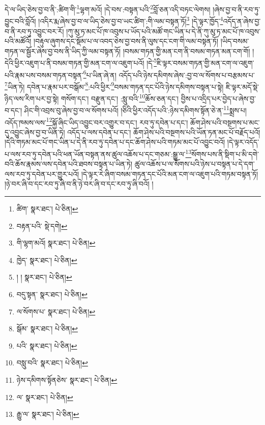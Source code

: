 དེ་ལ་ཡིད་ཅེས་བྱ་བ་ནི་:ཚིག་གི་\footnote{ཚིག་  སྣར་ཐང་།  པེ་ཅིན། }ལྷག་མའོ། །དེ་བས་:བསྟན་པའི་\footnote{བརྟན་པའི་  སྡེ་དགེ། }བློ་ཅན་འདི་བཏང་ལེགས། །ཞེས་བྱ་བ་ནི་རབ་ཏུ་བྱུང་བའི་བློའོ། །འདིར་རྨ་ཞེས་བྱ་བ་ལ་ཡིད་ཅེས་བྱ་བ་ཡང་ཚིག་:གི་ལམ་བསྟན་ཏོ།\footnote{གི་ལྷག་མའོ།  སྣར་ཐང་།  པེ་ཅིན། } །དེ་ལྟར་ཁྱོད་\footnote{ཁྱེད་  སྣར་ཐང་།  པེ་ཅིན། }འདོད་ན་ཞེས་བྱ་བ་ནི་རབ་ཏུ་འབྱུང་བར་རོ། །ཀུ་མུ་ཏ་མང་པོ་ཁ་འབུས་པ་ཡོད་པའི་མཚོ་གང་ཡིན་པ་དེ་ནི་ཀུ་མུ་ཏ་མང་པོ་ཁ་འབུས་པའི་མཚོའོ། །བརྟུལ་ཞུགས་དང་སྡོམ་པ་ལ་འབད་ཅེས་བྱ་བས་ནི་ལུས་དང་ངག་གི་ལམ་བསྟན་ཏོ། །ཡིད་བསམ་གཏན་ལ་སྦྱོར་ཞེས་བྱ་བས་ནི་ཡིད་ཀྱི་ལམ་བསྟན་ཏོ། །བསམ་གཏན་གྱི་མན་ངག་ནི་བསམ་གཏན་མན་ངག་གོ། །དེའི་ཕྱིར་འཇུག་པ་ནི་བསམ་གཏན་གྱི་མན་ངག་ལ་འཇུག་པའོ། །དེ་\footnote{། །  སྣར་ཐང་།  པེ་ཅིན། }ཇི་ལྟར་བསམ་གཏན་གྱི་མན་ངག་ལ་འཇུག་པའི་རྣམ་པས་བསམ་གཏན་བསྟན་\footnote{བདུ་སྟན་  སྣར་ཐང་།  པེ་ཅིན། }པ་ཡིན་ཞེ་ན། འདོད་པའི་ཉེས་དམིགས་ཞེས་:བྱ་བ་ལ་སོགས་པ་བརྩམས་པ་\footnote{ལ་སོགས་པ་  སྣར་ཐང་།  པེ་ཅིན། }ཡིན་ཏེ། དབེན་པ་རྣམ་པར་བསྒོམ་\footnote{སྒོམ་  སྣར་ཐང་།  པེ་ཅིན། }:པའི་ཕྱིར་\footnote{པའི་  སྣར་ཐང་།  པེ་ཅིན། }བསམ་གཏན་དང་པོའི་ཉེས་དམིགས་བསྟན་པ་སྟེ། ཇི་ལྟར་མདོ་སྡེ་ཉིད་ལས་རིག་པར་བྱ་སྟེ། གསོག་དང་། བརྫུན་དང་། :སླུ་བའི་\footnote{བསླུ་བའི་  སྣར་ཐང་།  པེ་ཅིན། }ཆོས་ཅན་དང་། བྱིས་པ་འདྲིད་པར་བྱེད་པ་ཞེས་བྱ་བ་དང་། ཤིང་གི་འབྲས་བུ་ཞེས་བྱ་བ་ལ་སོགས་པའོ། །ཅིའི་ཕྱིར་འདོད་པའི་:ཉེས་དམིགས་སྟོན་ཅེ་ན་\footnote{ཉེས་དམིགས་སྟོནཅེས་  སྣར་ཐང་།  པེ་ཅིན། }སྨྲས་པ། འདོད་ཁམས་ལས་\footnote{ལ་  སྣར་ཐང་།  པེ་ཅིན། }སྐྱོ་ཞིང་ཡིད་འབྱུང་བར་འགྱུར་བ་དང་། རབ་ཏུ་དབེན་པ་དང་། ཆོག་ཤེས་པའི་བསྔགས་པ་མང་དུ་འབྱུང་ཞེས་བྱ་བ་ཡིན་ཏེ། འདོད་པ་ལས་དབེན་པ་དང་། ཆོག་ཤེས་པའི་བསྔགས་པའི་ཡོན་ཏན་མང་པོ་བརྗོད་པའོ། །དེའི་གཏམ་མང་པོ་གང་ཡིན་པ་དེ་ནི་རབ་ཏུ་དབེན་པ་དང་ཆོག་ཤེས་པའི་གཏམ་མང་པོ་འབྱུང་བའོ། །དེ་ལྟར་འདོད་པ་ལས་རབ་ཏུ་དབེན་པའི་ཕན་ཡོན་བསྟན་ནས་ཚུལ་འཆོས་པ་དང་གཅམ་:སྒྱུ་ལ་\footnote{རྒྱུ་ལ་  སྣར་ཐང་།  པེ་ཅིན། }སོགས་པས་ནི་སྡིག་པ་མི་དགེ་བའི་ཆོས་རྣམས་ལས་དབེན་པའི་ཐབས་བསྟན་པ་ཡིན་ཏེ། ཚུལ་འཆོས་པ་ལ་སོགས་པའི་ཉེས་པ་བསྟན་པ་དེ་དག་ལས་རབ་ཏུ་དབེན་པར་གྱུར་པའོ། །དེ་ལྟར་རེ་ཞིག་བསམ་གཏན་དང་པོའི་མན་ངག་ལ་འཇུག་པའི་གཏམ་བསྟན་ཏོ། །ཉེ་བར་ཞི་བ་དང་རབ་ཏུ་ཞི་བ་ནི་ཉེ་བར་ཞི་བ་དང་རབ་ཏུ་ཞི་བའོ། །
